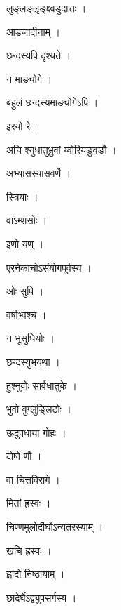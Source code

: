 \documentclass[10pt, openany]{book}
\begin{document}
\noindent लुङ्लङ्लृङ्क्ष्वडुदात्तः ।

\noindent आडजादीनाम् ।

\noindent छन्दस्यपि दृश्यते ।

\noindent न माङ्योगे ।

\noindent बहुलं छन्दस्यमाङ्योगेऽपि ।

\noindent इरयो रे ।

\noindent अचि श्नुधातुभ्रुवां य्वोरियङुवङौ ।

\noindent अभ्यासस्यासवर्णे ।

\noindent स्त्रियाः ।

\noindent वाऽम्शसोः ।

\noindent इणो यण् ।

\noindent एरनेकाचोऽसंयोगपूर्वस्य ।

\noindent ओः सुपि ।

\noindent वर्षाभ्वश्च ।

\noindent न भूसुधियोः ।

\noindent छन्दस्युभयथा ।

\noindent हुश्नुवोः सार्वधातुके ।

\noindent भुवो वुग्लुङ्लिटोः ।

\noindent ऊदुपधाया गोहः ।

\noindent दोषो णौ ।

\noindent वा चित्तविरागे ।

\noindent मितां ह्रस्वः ।

\noindent चिण्णमुलोर्दीर्घोऽन्यतरस्याम् ।

\noindent खचि ह्रस्वः ।

\noindent ह्लादो निष्ठायाम् ।

\noindent छादेर्घेऽद्व्युपसर्गस्य ।
\end{document}
